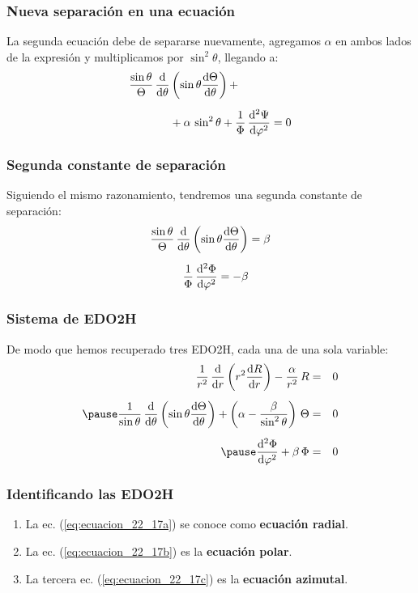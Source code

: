 \documentclass[12pt]{beamer}
\begin{document}
\begin{frame}
\frametitle{Nueva separación en una ecuación}
La segunda ecuación debe de separarse nuevamente, agregamos $\alpha$ en ambos lados de la expresión y multiplicamos por $\sin^{2} \theta$, llegando a:
\pause
\begin{align*}
\dfrac{\sin \theta}{\Theta} \, \dv{\theta} &\left( \sin \theta \dv{\Theta}{\theta} \right) + \\[0.5em]
&+\alpha \, \sin^{2} \theta +  \dfrac{1}{\Phi} \, \dv[2]{\Psi}{\varphi} = 0
\end{align*}
\end{frame}
\begin{frame}
\frametitle{Segunda constante de separación}
Siguiendo el mismo razonamiento, tendremos una segunda constante de separación:
\pause
\begin{align*}
\dfrac{\sin \theta}{\Theta} \, \dv{\theta} \left( \sin \theta \dv{\Theta}{\theta} \right) &= \beta \\[0.5em]
\dfrac{1}{\Phi} \, \dv[2]{\Phi}{\varphi} = - \beta
\end{align*}
\end{frame}
\begin{frame}
\frametitle{Sistema de EDO2H}
De modo que hemos recuperado tres EDO2H, cada una de una sola variable:
\pause
\begin{eqnarray}
\dfrac{1}{r^{2}} \, \dv{r} \left( r^{2} \dv{R}{r} \right) - \dfrac{\alpha}{r^{2}} \, R &=& 0 \label{eq:ecuacion_22_17a} \\[0.5em] \pause
\dfrac{1}{\sin \theta} \, \dv{\theta} \left( \sin \theta \dv{\Theta}{\theta} \right) + \left( \alpha - \dfrac{\beta}{\sin^{2} \theta} \right) \, \Theta &=& 0 \label{eq:ecuacion_22_17b} \\[0.5em] \pause
\dv[2]{\Phi}{\varphi} + \beta \, \Phi &=& 0 \label{eq:ecuacion_22_17c}
\end{eqnarray}
\end{frame}
\begin{frame}
\frametitle{Identificando las EDO2H}
\begin{enumerate}[<+->]
\item La ec. (\ref{eq:ecuacion_22_17a}) se conoce como \textbf{ecuación radial}.
\item La ec. (\ref{eq:ecuacion_22_17b}) es la \textbf{ecuación polar}.
\item La tercera ec. (\ref{eq:ecuacion_22_17c}) es la \textbf{ecuación azimutal}.
\end{enumerate}
\end{frame}
\end{document}
